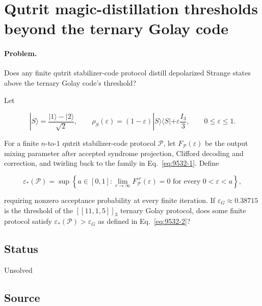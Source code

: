 \section{Qutrit magic-distillation thresholds beyond the ternary Golay code}
\label{sec:op_953280faa99bec1d}

\paragraph{Problem.}
Does any finite qutrit stabilizer-code protocol distill depolarized Strange states above the ternary Golay code's threshold?

Let

\begin{equation}
|S\rangle=\frac{|1\rangle-|2\rangle}{\sqrt2},
\qquad
\rho_S(\varepsilon)=(1-\varepsilon)|S\rangle\langle S|+\varepsilon\frac{I_3}{3},\qquad 0\leq\varepsilon\leq1.
\label{eq:9532-1}
\end{equation}

For a finite $n$-to-$1$ qutrit stabilizer-code protocol $\mathcal P$, let $F_{\mathcal P}(\varepsilon)$ be the output mixing parameter after accepted syndrome projection, Clifford decoding and correction, and twirling back to the family in Eq.~\eqref{eq:9532-1}. Define

\begin{equation}
\varepsilon_*(\mathcal P)=\sup\left\{a\in[0,1]:
\lim_{r\to\infty}F_{\mathcal P}^{\circ r}(\varepsilon)=0
\text{ for every }0<\varepsilon<a\right\},
\label{eq:9532-2}
\end{equation}

requiring nonzero acceptance probability at every finite iteration. If $\varepsilon_G\approx0.38715$ is the threshold of the $[[11,1,5]]_3$ ternary Golay protocol, does some finite protocol satisfy $\varepsilon_*(\mathcal P)>\varepsilon_G$ as defined in Eq.~\eqref{eq:9532-2}?

\subsection*{Status}

Unsolved

\subsection*{Source}

